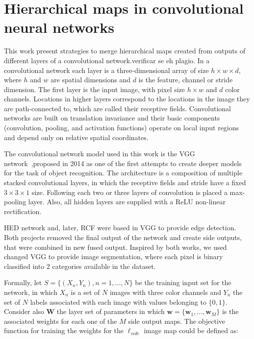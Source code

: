 \section{Hierarchical maps in convolutional neural networks}
\label{sec:method}

This work present strategies to merge hierarchical maps created from  outputs of different layers of a convolutional network.{\color{green}verificar se eh plagio}. In a convolutional network each layer is a three-dimensional array of size $h \times w \times d$, where $h$ and $w$ are spatial dimensions  and $d$ is the feature, channel or stride dimension. The first layer is the input image, with pixel size $h \times w$ and $d$ color channels. Locations in higher layers correspond to the locations in the image they are path-connected to, which are called their receptive fields. Convolutional networks are built on translation invariance and their basic components (convolution, pooling, and activation functions) operate on local input regions and depend only on relative spatial coordinates. 

The convolutional network model used in this work is the VGG network~\cite{simonyan2014},proposed in 2014 as one of the first attempts to create deeper models for the task of object recognition. The architecture is a composition of multiple stacked convolutional layers, in which the receptive fields and stride have a fixed $3\times3\times1$ size. Following each two or three layers of convolution is placed a max-pooling layer. Also, all hidden layers are supplied with a ReLU non-linear rectification.

HED network \cite{Xie:2017:HED:3158436.3158453} and, later, RCF \cite{RCF:8100105} were based in VGG to provide edge detection. Both projects removed the final output of the network and create side outputs, that were combined in new fused output. Inspired by both works, we used changed VGG to provide image segmentation, where each pixel is binary classified into 2 categories available in the dataset.

Formally, let $\mathit{S}=\{(\mathit{X_n,Y_n}), \mathit{n}=1,...,\mathit{N}\}$ be the training input set for the network, in which $\mathit{X_n}$ is a set of $\mathit{N}$ images with three color channels and $\mathit{Y_n}$ the set of $\mathit{N}$ labels associated with each image with values belonging to $\{0,1\}$. Consider also $\mathbf{W}$ the layer set of parameters in which
$\mathbf{w}=\{\mathbf{w}_1,...,\mathbf{w}_M\}$ is the associated weights for each one of the $\mathit{M}$ side output maps. The objective function for training the weights for the $\ell_{side}$ image map could be defined as:

